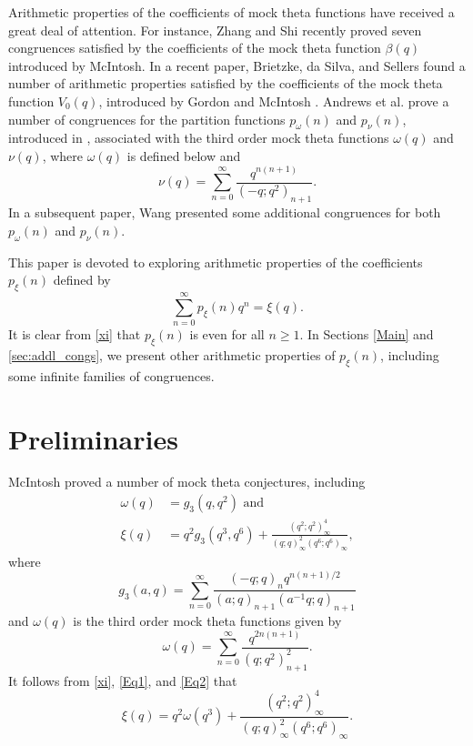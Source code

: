 \documentclass[12pt]{article}
\begin{document}
Arithmetic properties of the coefficients of mock theta functions have received a great deal of attention. For instance, Zhang and Shi \cite{Z-S} recently proved seven congruences satisfied by the coefficients of the mock theta function $\beta(q)$ introduced by McIntosh. In a recent paper, Brietzke, da Silva, and Sellers \cite{BSS} found a number of arithmetic properties satisfied by the coefficients of the mock theta function $V_0(q)$, introduced by Gordon and McIntosh \cite{G-M-0}. Andrews et al. \cite{APSY} prove a number of congruences for the partition functions $p_{\omega}(n)$ and $p_{\nu}(n)$, introduced in \cite{Andrews1}, associated with the third order mock theta functions $\omega(q)$ and $\nu(q)$, where $\omega(q)$ is defined below and 
$$\nu(q) = \sum_{n=0}^{\infty} \frac{q^{n(n+1)}}{(-q;q^2)_{n+1}}.$$
In a subsequent paper, Wang \cite{Wang} presented some additional congruences for both $p_{\omega}(n)$ and $p_{\nu}(n)$.


This paper is devoted to exploring arithmetic properties of the coefficients $p_{\xi}(n)$ defined by 
\begin{equation}
\sum_{n=0}^{\infty} p_{\xi}(n)q^n = \xi(q).
\label{Eq4}
\end{equation} 
It is clear from \eqref{xi} that $p_{\xi}(n)$ is even for all $n \geq 1$. In Sections \ref{Main} and \ref{sec:addl_congs}, we present other arithmetic properties of $p_{\xi}(n)$, including some infinite families of congruences.




\section{Preliminaries}
\label{sec:preliminaries}

McIntosh \cite[Theorem 3]{McIntosh} proved a number of mock theta conjectures, including 
\begin{align}
\omega(q) & = g_3(q,q^2) \textrm{\ \ \ and}  \label{Eq1} \\
\xi(q) & = q^2g_3(q^3,q^6) + \frac{(q^2;q^2)_{\infty}^{4}}{(q;q)_{\infty}^2(q^6;q^6)_{\infty}}, \label{Eq2}
\end{align}
where
$$g_3(a,q) = \sum_{n=0}^{\infty} \frac{(-q;q)_n q^{n(n+1)/2}}{(a;q)_{n+1}(a^{-1}q;q)_{n+1}}$$
and $\omega(q)$ is the third order mock theta functions given by
$$\omega(q) = \sum_{n=0}^{\infty} \frac{q^{2n(n+1)}}{(q;q^2)_{n+1}^2}.$$
It follows from \eqref{xi}, \eqref{Eq1}, and \eqref{Eq2} that
\begin{equation}
\xi(q) = q^2\omega(q^3) + \frac{(q^2;q^2)_{\infty}^{4}}{(q;q)_{\infty}^2(q^6;q^6)_{\infty}}.
\label{Eq3}
\end{equation}
\end{document}
